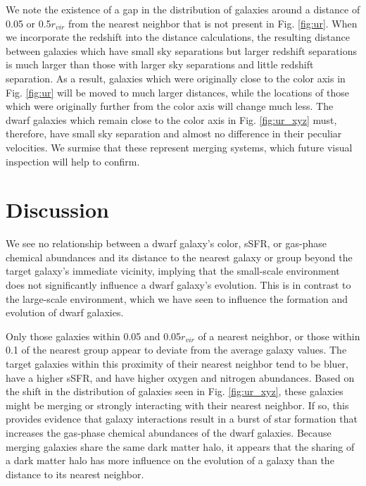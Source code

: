We note the existence of a gap in the distribution of galaxies around a distance 
of 0.05 \hMpc or 0.5$r_{vir}$ from the nearest neighbor that is not present in 
Fig. \ref{fig:ur}.  When we incorporate the redshift into the distance 
calculations, the resulting distance between galaxies which have small sky 
separations but larger redshift separations is much larger than those with 
larger sky separations and little redshift separation.  As a result, galaxies 
which were originally close to the color axis in Fig. \ref{fig:ur} will be 
moved to much larger distances, while the locations of those which were 
originally further from the color axis will change much less.  The dwarf 
galaxies which remain close to the color axis in Fig. \ref{fig:ur_xyz} must, 
therefore, have small sky separation and almost no difference in their peculiar 
velocities.  We surmise that these represent merging systems, which future 
visual inspection will help to confirm.




\section[Discussion]{Discussion}

We see no relationship between a dwarf galaxy's color, sSFR, or gas-phase 
chemical abundances and its distance to the nearest galaxy or group beyond the 
target galaxy's immediate vicinity, implying that the small-scale environment 
does not significantly influence a dwarf galaxy's evolution.  This is in 
contrast to the large-scale environment, which we have seen to influence the 
formation and evolution of dwarf galaxies.

Only those galaxies within 0.05 \hMpc and 0.05$r_{vir}$ of a nearest neighbor, 
or those within 0.1 \hMpc of the nearest group appear to deviate from the 
average galaxy values.  The target galaxies within this proximity of their 
nearest neighbor tend to be bluer, have a higher sSFR, and have higher oxygen 
and nitrogen abundances.  Based on the shift in the distribution of galaxies 
seen in Fig. \ref{fig:ur_xyz}, these galaxies might be merging or strongly 
interacting with their nearest neighbor.  If so, this provides evidence that 
galaxy interactions result in a burst of star formation that increases the 
gas-phase chemical abundances of the dwarf galaxies.  Because merging galaxies 
share the same dark matter halo, it appears that the sharing of a dark matter 
halo has more influence on the evolution of a galaxy than the distance to its 
nearest neighbor.

